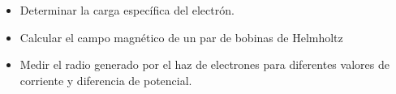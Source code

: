 \begin{itemize}
    \item Determinar la carga específica del electrón.
    \item Calcular el campo magnético de un par de bobinas de Helmholtz
    \item Medir el radio generado por el haz de electrones para diferentes valores de corriente y diferencia de potencial.
\end{itemize}
